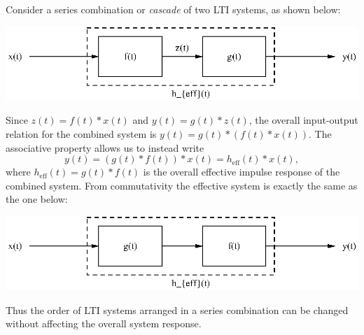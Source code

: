 \documentclass[10pt]{beamer}
\newcommand{\conv}{\ast}
\begin{document}
Consider a series combination or {\em cascade} of two LTI systems, as shown below:
\begin{center}
  \includegraphics{lticascade}
\end{center}
Since $z(t) = f(t) \conv x(t)$ and $y(t) = g(t) \conv z(t)$, the overall input-output relation for the combined system is $y(t) = g(t) \conv (f(t) \conv x(t))$.  The associative property allows us to instead write
\begin{equation*}
  y(t) = (g(t) \conv f(t)) \conv x(t)= h_{\text{eff}}(t) \conv x(t),
\end{equation*}
where $h_{\text{eff}}(t) = g(t) \conv f(t)$ is the overall effective impulse response of the combined system.  From commutativity the effective system is exactly the same as the one below:
\begin{center}
  \includegraphics{lticascade2}
\end{center}
Thus the order of LTI systems arranged in a series combination can be changed without affecting the overall system response.
\end{document}
